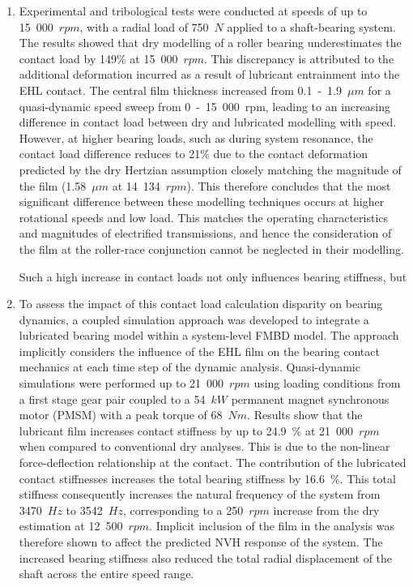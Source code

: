 \begin{enumerate}
	\item Experimental and tribological tests were conducted at speeds of up to 15~000~$rpm$, with a radial load of 750~$N$ applied to a shaft-bearing system. The results showed that dry modelling of a roller bearing underestimates the contact load by 149\% at 15~000~$rpm$. This discrepancy is attributed to the additional deformation incurred as a result of lubricant entrainment into the EHL contact. The central film thickness increased from 0.1~-~1.9~${\mu m}$ for a quasi-dynamic speed sweep from 0~-~15~000~rpm, leading to an increasing difference in contact load between dry and lubricated modelling with speed. However, at higher bearing loads, such as during system resonance, the contact load difference reduces to 21\% due to the contact deformation predicted by the dry Hertzian assumption closely matching the magnitude of the film (1.58~${\mu m}$ at 14~134~$rpm$). This therefore concludes that the most significant difference between these modelling techniques occurs at higher rotational speeds and low load. This matches the operating characteristics and magnitudes of electrified transmissions, and hence the consideration of the film at the roller-race conjunction cannot be neglected in their modelling.
		
	Such a high increase in contact loads not only influences bearing stiffness, but 
		
	\item To assess the impact of this contact load calculation disparity on bearing dynamics, a coupled simulation approach was developed to integrate a lubricated bearing model within a system-level FMBD model. The approach implicitly considers the influence of the EHL film on the bearing contact mechanics at each time step of the dynamic analysis. Quasi-dynamic simulations were performed up to 21~000~$rpm$ using loading conditions from a first stage gear pair coupled to a 54~$kW$ permanent magnet synchronous motor (PMSM) with a peak torque of 68~$Nm$. Results show that the lubricant film increases contact stiffness by up to 24.9~\% at 21~000~$rpm$ when compared to conventional dry analyses. This is due to the non-linear force-deflection relationship at the contact. 
	The contribution of the lubricated contact stiffnesses increases the total bearing stiffness by 16.6~\%. This total stiffness consequently increases the natural frequency of the system from 3470~$Hz$ to 3542~$Hz$, corresponding to a 250~$rpm$ increase from the dry estimation at 12~500~$rpm$. Implicit inclusion of the film in the analysis was therefore shown to affect the predicted NVH response of the system. The increased bearing stiffness also reduced the total radial displacement of the shaft across the entire speed range.
	

\end{enumerate}
